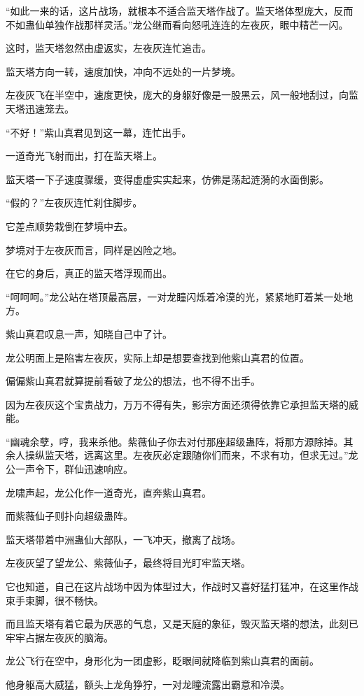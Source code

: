 \begin{this_body}
“如此一来的话，这片战场，就根本不适合监天塔作战了。监天塔体型庞大，反而不如蛊仙单独作战那样灵活。”龙公继而看向怒吼连连的左夜灰，眼中精芒一闪。

这时，监天塔忽然由虚返实，左夜灰连忙追击。

监天塔方向一转，速度加快，冲向不远处的一片梦境。

左夜灰飞在半空中，速度更快，庞大的身躯好像是一股黑云，风一般地刮过，向监天塔迅速笼去。

“不好！”紫山真君见到这一幕，连忙出手。

一道奇光飞射而出，打在监天塔上。

监天塔一下子速度骤缓，变得虚虚实实起来，仿佛是荡起涟漪的水面倒影。

“假的？”左夜灰连忙刹住脚步。

它差点顺势栽倒在梦境中去。

梦境对于左夜灰而言，同样是凶险之地。

在它的身后，真正的监天塔浮现而出。

“呵呵呵。”龙公站在塔顶最高层，一对龙瞳闪烁着冷漠的光，紧紧地盯着某一处地方。

紫山真君叹息一声，知晓自己中了计。

龙公明面上是陷害左夜灰，实际上却是想要查找到他紫山真君的位置。

偏偏紫山真君就算提前看破了龙公的想法，也不得不出手。

因为左夜灰这个宝贵战力，万万不得有失，影宗方面还须得依靠它承担监天塔的威能。

“幽魂余孽，哼，我来杀他。紫薇仙子你去对付那座超级蛊阵，将那方源除掉。其余人操纵监天塔，远离这里。左夜灰必定跟随你们而来，不求有功，但求无过。”龙公一声令下，群仙迅速响应。

龙啸声起，龙公化作一道奇光，直奔紫山真君。

而紫薇仙子则扑向超级蛊阵。

监天塔带着中洲蛊仙大部队，一飞冲天，撤离了战场。

左夜灰望了望龙公、紫薇仙子，最终将目光盯牢监天塔。

它也知道，自己在这片战场中因为体型过大，作战时又喜好猛打猛冲，在这里作战束手束脚，很不畅快。

而且监天塔有着它最为厌恶的气息，又是天庭的象征，毁灭监天塔的想法，此刻已牢牢占据左夜灰的脑海。

龙公飞行在空中，身形化为一团虚影，眨眼间就降临到紫山真君的面前。

他身躯高大威猛，额头上龙角狰狞，一对龙瞳流露出霸意和冷漠。


\end{this_body}
